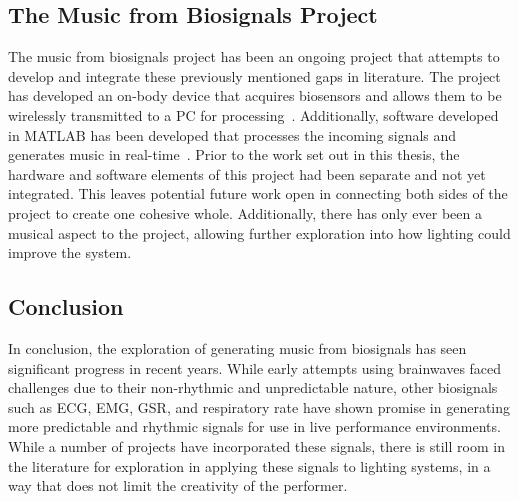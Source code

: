 \subsection{The Music from Biosignals Project}
The music from biosignals project has been an ongoing project that attempts to develop and integrate these previously mentioned gaps in literature.
The project has developed an on-body device that acquires biosensors and allows them to be wirelessly transmitted to a PC for processing~\cite{Pierro:2019}\cite{Tran:2022}.
Additionally, software developed in MATLAB has been developed that processes the incoming signals and generates music in real-time~\cite{Chen:2016}\cite{Nicholls:2019}.
Prior to the work set out in this thesis, the hardware and software elements of this project had been separate and not yet integrated.
This leaves potential future work open in connecting both sides of the project to create one cohesive whole.
Additionally, there has only ever been a musical aspect to the project, allowing further exploration into how lighting could improve the system.

\subsection{Conclusion}
In conclusion, the exploration of generating music from biosignals has seen significant progress in recent years.
While early attempts using brainwaves faced challenges due to their non-rhythmic and unpredictable nature,
other biosignals such as ECG, EMG, GSR, and respiratory rate have shown promise in generating more predictable and rhythmic signals for use in live performance environments.
While a number of projects have incorporated these signals, there is still room in the literature for exploration in applying these signals to lighting systems, in a way that does not limit the creativity of the performer.
